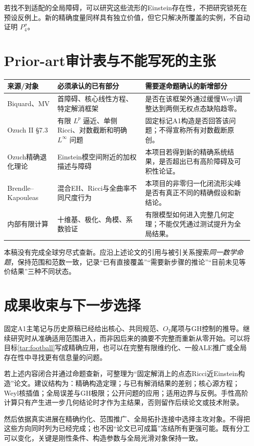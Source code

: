 \documentclass[UTF8,a4paper,11pt,fontset=fandol]{ctexart}
\numberwithin{equation}{section}
\theoremstyle{definition}
\begin{document}
若找不到适配的全局障碍，可以研究这些流形的Einstein存在性，不把研究锁死在预设反例上。新的精确度量同样具有独立价值，但它只解决所覆盖的实例，不自动证明 $P_4^\sigma$。

\section{Prior-art审计表与不能写死的主张}
\begin{longtable}{L{.22\textwidth}L{.34\textwidth}L{.35\textwidth}}
\toprule 来源/对象 & 必须承认的已有部分 & 需要逐命题确认的新增部分\\\midrule\endhead
Biquard、MV & 首障碍、核心线性方程、特定解消框架 & 是否在该框架外通过缓慢Weyl调整达到两侧无权点态缺陷趋零。\\
Ozuch II \S7.3 & 有限 $L^p$ 逼近、单侧Ricci、对数截断和明确 $L^\infty$ 问题 & 固定标记A1构造是否回答该问题；不得宣称所有对数截断原创。\\
Ozuch精确退化理论 & Einstein模空间附近的加权描述与障碍 & 本项目若得到新的精确系统结果，是否超出已有高阶障碍及可积性论证。\\
Brendle--Kapouleas & 混合EH、Ricci与全曲率不同尺度行为 & 本项目的非零归一化闭流形尖峰是否有真正不同的精确假设和新结论。\\
内部有限计算 & 十维基、极化、角模、系数验证 & 有限模型如何进入完整几何定理；不能仅凭通过测试提升为全局结果。\\\bottomrule
\end{longtable}
本稿没有完成全球穷尽式查新。应沿上述论文的引用与被引关系搜索\emph{同一数学命题}，保持范围和范数一致，记录“已有直接覆盖”“需要新步骤的推论”“目前未见等价结果”三种不同状态。

\section{成果收束与下一步选择}
固定A1主笔记与历史原稿已经给出核心、共同规范、$O_2$尾项与GH控制的推导。继续研究时从准确适用范围进入，而非因后来的摘要不完整而重新从零开始。可以将目标\ref{tar:football}写成精确应用，也可以在完整有限维约化、一般ALE推广或全局存在性中寻找更有信息量的问题。

若上述内容闭合并通过命题查新，可整理为“固定解消上的点态Ricci近Einstein构造”论文。建议结构为：精确构造定理；与已有解消结果的差别；核心源方程；Weyl核插值；全局误差与GH极限；公开问题的应用；适用边界与反例。手性高阶计算只有产生进一步几何结论时才作为主结果，否则留作后续论文或技术附录。

然后依据真实进展在精确约化、范围推广、全局拓扑连接中选择主攻对象。不得把这些方向同时列为已经完成；也不因“论文已可成篇”冻结所有更强可能。既有分工可以变化，关键是刚性条件、构造参数与全局光滑对象保持一致。
\end{document}
